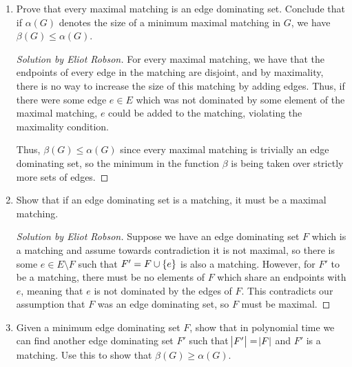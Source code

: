 \documentclass{article}
\newenvironment{solution}[1]{\begin{proof}[Solution by #1]}{\end{proof}}
\begin{document}
\begin{enumerate}
	\item Prove that every maximal matching is an edge dominating set. Conclude that if \(\alpha(G)\) denotes the size of a minimum maximal matching in \(G\), we have \(\beta(G) \leq \alpha(G)\).
	
    \begin{solution}{Eliot Robson}
        For every maximal matching, we have that the endpoints of every edge in the matching are disjoint, and by maximality, there is no way to increase the size of this matching by adding edges. Thus, if there were some edge \(e \in E\) which was not dominated by some element of the maximal matching, \(e\) could be added to the matching, violating the maximality condition.
        
        Thus, \(\beta(G) \leq \alpha(G)\) since every maximal matching is trivially an edge dominating set, so the minimum in the function \(\beta\) is being taken over strictly more sets of edges.
    \end{solution}
    
	\item Show that if an edge dominating set is a matching, it must be a maximal matching.
    
    \begin{solution}{Eliot Robson}
        Suppose we have an edge dominating set \(F\) which is a matching and assume towards contradiction it is not maximal, so there is some \(e \in E \setminus F\) such that \(F' = F \cup \set{e}\) is also a matching. However, for \(F'\) to be a matching, there must be no elements of \(F\) which share an endpoints with \(e\), meaning that \(e\) is not dominated by the edges of \(F\). This contradicts our assumption that \(F\) was an edge dominating set, so \(F\) must be maximal.
    \end{solution}
	
	\item Given a minimum edge dominating set \(F\), show that in polynomial time we can find another edge dominating set \(F'\) such that \(\abs{F'} = \abs{F}\) and \(F'\) is a matching. Use this to show that \(\beta(G) \geq \alpha(G)\).
    

\end{enumerate}
\end{document}
